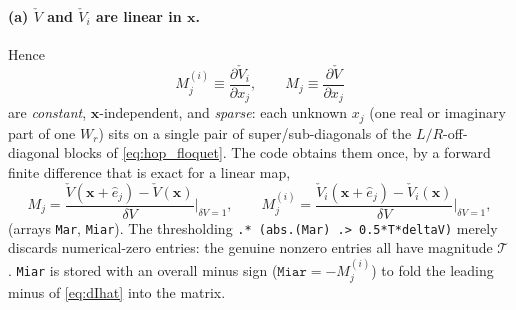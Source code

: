 \documentclass[11pt,a4paper]{article}
\newcommand{\Wm}{W}
\begin{document}
\paragraph{(a) $\check V$ and $\check V_i$ are linear in $\mathbf x$.}
Hence
\begin{equation}
  M^{(i)}_j \equiv \frac{\partial \check V_i}{\partial x_j},
  \qquad
  M_j \equiv \frac{\partial \check V}{\partial x_j}
  \label{eq:Mdef}
\end{equation}
are \emph{constant}, $\mathbf x$-independent, and \emph{sparse}: each unknown
$x_j$ (one real or imaginary part of one $\Wm_r$) sits on a single pair of
super/sub-diagonals of the $L/R$-off-diagonal blocks of \eqref{eq:hop_floquet}.
The code obtains them once, by a forward finite difference that is exact for a
linear map,
\begin{equation}
  M_j = \frac{\check V(\mathbf x+\hat e_j)-\check V(\mathbf x)}{\delta V}\Big|_{\delta V=1},
  \qquad
  M^{(i)}_j = \frac{\check V_i(\mathbf x+\hat e_j)-\check V_i(\mathbf x)}{\delta V}\Big|_{\delta V=1},
\end{equation}
(arrays \texttt{Mar}, \texttt{Miar}).  The thresholding
\verb|.* (abs.(Mar) .> 0.5*T*deltaV)| merely discards numerical-zero entries: the
genuine nonzero entries all have magnitude $\mathcal T$.  \texttt{Miar} is stored
with an overall minus sign ($\texttt{Miar}=-M^{(i)}_j$) to fold the leading minus
of \eqref{eq:dIhat} into the matrix.
\end{document}
